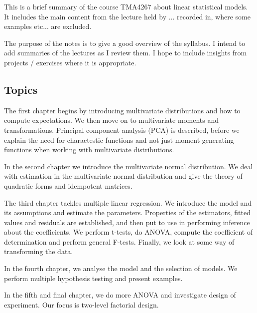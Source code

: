 
This is a brief summary of the course TMA4267 about linear statistical models. It includes the main content from the lecture held by \TODO{}... recorded in, where some examples etc... are excluded. 

The purpose of the notes is to give a good overview of the syllabus. I intend to add summaries of the lectures as I review them. I hope to include insights from projects / exercises where it is appropriate. 

\subsection*{Topics}
The first chapter begins by introducing multivariate distributions and how to compute expectations. We then move on to multivariate moments and transformations. Principal component analysis (PCA) is described, before we explain the need for charactestic functions and not just moment generating functions when working with multivariate distributions. 

In the second chapter we introduce the multivariate normal distribution. We deal with estimation in the multivariate normal distribution and give the theory of quadratic forms and idempotent matrices.

The third chapter tackles multiple linear regression. We introduce the model and its assumptions and estimate the parameters. Properties of the estimators, fitted values and residuals are established, and then put to use in performing inference about the coefficients. We perform t-tests, do ANOVA, compute the coefficient of determination and perform general F-tests. Finally, we look at some way of transforming the data.

In the fourth chapter, we analyse the model and the selection of models. We perform multiple hypothesis testing and present examples. 

In the fifth and final chapter, we do more ANOVA and investigate design of experiment. Our focus is two-level factorial design.